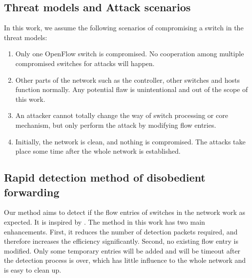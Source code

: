 \documentclass[conference]{IEEEtran}
\begin{document}
\subsection{Threat models and Attack scenarios}
In this work, we assume the following scenarios of compromising a switch in the threat models:
\begin{enumerate}
\item
Only one OpenFlow switch is compromised. No cooperation among multiple compromised switches for attacks will happen.
\item
Other parts of the network such as the controller, other switches and hosts function normally. Any potential flaw is unintentional and out of the scope of this work.
\item
An attacker cannot totally change the way of switch processing or core mechanism, but only perform the attack by modifying flow entries.
\item
Initially, the network is clean, and nothing is compromised. The attacks take place some time after the whole network is established.
\end{enumerate}

\subsection{Rapid detection method of disobedient forwarding}
Our method aims to detect if the flow entries of switches in the network work as expected. It is inspired by \cite{CKGL15}. The method in this work has two main enhancements. First, it reduces the number of detection packets required, and therefore increases the efficiency significantly. Second, no existing flow entry is modified. Only some temporary entries will be added and will be timeout after the detection process is over, which has little influence to the whole network and is easy to clean up. 
\end{document}
